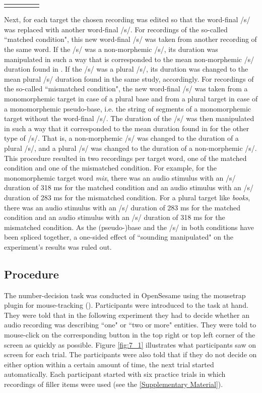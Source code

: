 \begin{table}
\begin{tabular}{llccc}
\lspbottomrule
\end{tabular}
\end{table}

Next, for each target the chosen recording was edited so that the word-final /s/ was replaced with another word-final /s/. For recordings of the so-called ``matched condition", this new word-final /s/ was taken from another recording of the same word. If the /s/ was a non-morphemic /s/, its duration was manipulated in such a way that is corresponded to the mean non-morphemic /s/ duration found in \citet{Plag2017}. If the /s/ was a plural /s/, its duration was changed to the mean plural /s/ duration found in the same study, accordingly. For recordings of the so-called ``mismatched condition", the new word-final /s/ was taken from a monomorphemic target in case of a plural base and from a plural target in case of a monomorphemic pseudo-base, i.e. the string of segments of a monomorphemic target without the word-final /s/. The duration of the /s/ was then manipulated in such a way that it corresponded to the mean duration found in \citet{Plag2017} for the other type of /s/. That is, a non-morphemic /s/ was changed to the duration of a plural /s/, and a plural /s/ was changed to the duration of a non-morphemic /s/. This procedure resulted in two recordings per target word, one of the matched condition and one of the mismatched condition. For example, for the monomorphemic target word \textit{mix}, there was an audio stimulus with an /s/ duration of 318 ms for the matched condition and an audio stimulus with an /s/ duration of 283 ms for the mismatched condition. For a plural target like \textit{books}, there was an audio stimulus with an /s/ duration of 283 ms for the matched condition and an audio stimulus with an /s/ duration of 318 ms for the mismatched condition. As the (pseudo-)base and the /s/ in both conditions have been spliced together, a one-sided effect of ``sounding manipulated" on the experiment’s results was ruled out.

\subsection{Procedure}\label{section07_1_3}

The number-decision task was conducted in OpenSesame using the mousetrap plugin for mouse-tracking (\cite{Kieslich2017}). Participants were introduced to the task at hand. They were told that in the following experiment they had to decide whether an audio recording was describing ``one" or ``two or more" entities. They were told to mouse-click on the corresponding button in the top right or top left corner of the screen as quickly as possible. Figure \ref{fig:7_1} illustrates what participants saw on screen for each trial. The participants were also told that if they do not decide on either option within a certain amount of time, the next trial started automatically. Each participant started with six practice trials in which recordings of filler items were used (see the \ref{Supplementary Material}).

